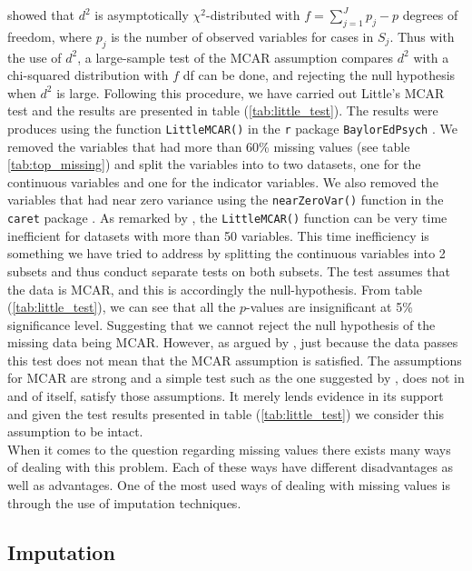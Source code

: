 \documentclass[../thesis.tex]{subfiles}
\begin{document}
\noindent \cite{little1988test} showed that $d^2$ is asymptotically $\chi^2$-distributed with $f = \sum_{j=1}^J p_j - p$ degrees of freedom, where $p_j$ is the number of observed variables for cases in $S_j$. Thus with the use of $d^2$, a large-sample test of the MCAR assumption compares $d^2$ with a chi-squared distribution with $f$ df can be done, and rejecting the null hypothesis when $d^2$ is large. Following this procedure, we have carried out Little's MCAR test and the results are presented in table (\ref{tab:little_test}). The results were produces using the function \texttt{LittleMCAR()} in the \texttt{r} package \texttt{BaylorEdPsych} \citep{BaylorEdPsych}. We removed the variables that had more than 60\% missing values (see table \ref{tab:top_missing}) and split the variables into to two datasets, one for the continuous variables and one for the indicator variables. We also removed the variables that had near zero variance using the \texttt{nearZeroVar()} function in the \texttt{caret} package \citep{kuhncaret}. As remarked by \cite{BaylorEdPsych}, the \texttt{LittleMCAR()} function can be very time inefficient for datasets with more than 50 variables. This time inefficiency is something we have tried to address by splitting the continuous variables into 2 subsets and thus conduct separate tests on both subsets. The test assumes that the data is MCAR, and this is accordingly the null-hypothesis. From table (\ref{tab:little_test}), we can see that all the $p$-values are insignificant at 5\% significance level. Suggesting that we cannot reject the null hypothesis of the missing data being MCAR. However, as argued by \cite{allison1999missing}, just because the data passes this test does not mean that the MCAR assumption is satisfied. The assumptions for MCAR are strong and a simple test such as the one suggested by \cite{little1988test}, does not in and of itself, satisfy those assumptions. It merely lends evidence in its support and given the test results presented in table (\ref{tab:little_test}) we consider this assumption to be intact.\\
\indent When it comes to the question regarding missing values there exists many ways of dealing with this problem. Each of these ways have different disadvantages as well as advantages. One of the most used ways of dealing with missing values is through the use of imputation techniques. 



\subsection{Imputation}
\label{subsec:impu}
\end{document}
